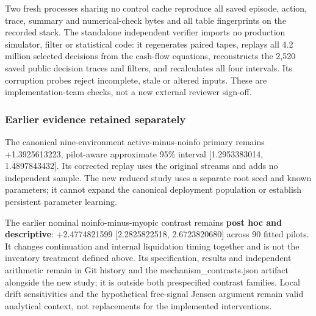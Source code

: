 \documentclass[
  10pt,
  a4paper,
]{article}
\begin{document}
Two fresh processes sharing no control cache reproduce all saved
episode, action, trace, summary and numerical-check bytes and all table
fingerprints on the recorded stack. The standalone independent verifier
imports no production simulator, filter or statistical code: it
regenerates paired tapes, replays all 4.2 million selected decisions
from the cash-flow equations, reconstructs the 2,520 saved public
decision traces and filters, and recalculates all four intervals. Its
corruption probes reject incomplete, stale or altered inputs. These are
implementation-team checks, not a new external reviewer sign-off.

\subsubsection{Earlier evidence retained
separately}\label{earlier-evidence-retained-separately}

The canonical nine-environment active-minus-noinfo primary remains
+1.3925613223, pilot-aware approximate 95\% interval {[}1.2953383014,
1.4897843432{]}. Its corrected replay uses the original streams and adds
no independent sample. The new reduced study uses a separate root seed
and known parameters; it cannot expand the canonical deployment
population or establish persistent parameter learning.

The earlier nominal noinfo-minus-myopic contrast remains \textbf{post
hoc and descriptive}: +2.4774821599 {[}2.2825822518, 2.6723820680{]}
across 90 fitted pilots. It changes continuation and internal
liquidation timing together and is not the inventory treatment defined
above. Its specification, results and independent arithmetic remain in
Git history and the mechanism\_contrasts.json artifact alongside the new
study; it is outside both prespecified contrast families. Local drift
sensitivities and the hypothetical free-signal Jensen argument remain
valid analytical context, not replacements for the implemented
interventions.
\end{document}
